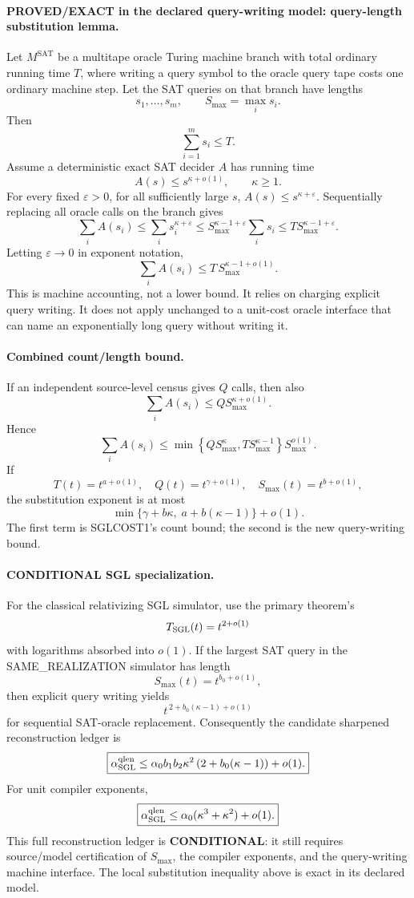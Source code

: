 \documentclass[11pt]{article}
\begin{document}
\paragraph{PROVED/EXACT in the declared query-writing model: query-length substitution lemma.}
Let \(M^{\mathrm{SAT}}\) be a multitape oracle Turing machine branch with total ordinary running time \(T\), where writing a query symbol to the oracle query tape costs one ordinary machine step. Let the SAT queries on that branch have lengths
\[
s_1,\ldots,s_m,\qquad S_{\max}=\max_i s_i.
\]
Then
\[
\boxed{\sum_{i=1}^m s_i\le T.}
\]
Assume a deterministic exact SAT decider \(A\) has running time
\[
A(s)\le s^{\kappa+o(1)},\qquad \kappa\ge1.
\]
For every fixed \(\varepsilon>0\), for all sufficiently large \(s\),
\(A(s)\le s^{\kappa+\varepsilon}\). Sequentially replacing all oracle calls on the branch gives
\[
\sum_i A(s_i)
\le
\sum_i s_i^{\kappa+\varepsilon}
\le
S_{\max}^{\kappa-1+\varepsilon}\sum_i s_i
\le
T S_{\max}^{\kappa-1+\varepsilon}.
\]
Letting \(\varepsilon\to0\) in exponent notation,
\[
\boxed{
\sum_i A(s_i)\le T\,S_{\max}^{\kappa-1+o(1)}.
}
\]
This is machine accounting, not a lower bound. It relies on charging explicit query writing. It does not apply unchanged to a unit-cost oracle interface that can name an exponentially long query without writing it.

\paragraph{Combined count/length bound.}
If an independent source-level census gives \(Q\) calls, then also
\[
\sum_i A(s_i)\le Q S_{\max}^{\kappa+o(1)}.
\]
Hence
\[
\boxed{
\sum_i A(s_i)
\le
\min\!\left\{
Q S_{\max}^{\kappa},
T S_{\max}^{\kappa-1}
\right\}S_{\max}^{o(1)}.
}
\]
If
\[
T(t)=t^{a+o(1)},\quad Q(t)=t^{\gamma+o(1)},\quad
S_{\max}(t)=t^{b+o(1)},
\]
the substitution exponent is at most
\[
\boxed{
\min\{\gamma+b\kappa,\;a+b(\kappa-1)\}+o(1).
}
\]
The first term is SGLCOST1's count bound; the second is the new query-writing bound.

\paragraph{CONDITIONAL SGL specialization.}
For the classical relativizing SGL simulator, use the primary theorem's
\[
T_{\rm SGL}(t)=t^{2+o(1)}
\]
with logarithms absorbed into \(o(1)\). If the largest SAT query in the SAME\_REALIZATION simulator has length
\[
S_{\max}(t)=t^{b_0+o(1)},
\]
then explicit query writing yields
\[
\boxed{
t^{\,2+b_0(\kappa-1)+o(1)}
}
\]
for sequential SAT-oracle replacement. Consequently the candidate sharpened reconstruction ledger is
\[
\boxed{
\alpha_{\rm SGL}^{\rm qlen}
\le
\alpha_0 b_1b_2\kappa^2
\left(2+b_0(\kappa-1)\right)+o(1).
}
\]
For unit compiler exponents,
\[
\boxed{
\alpha_{\rm SGL}^{\rm qlen}
\le
\alpha_0(\kappa^3+\kappa^2)+o(1).
}
\]
This full reconstruction ledger is \textbf{CONDITIONAL}: it still requires source/model certification of \(S_{\max}\), the compiler exponents, and the query-writing machine interface. The local substitution inequality above is exact in its declared model.
\end{document}
